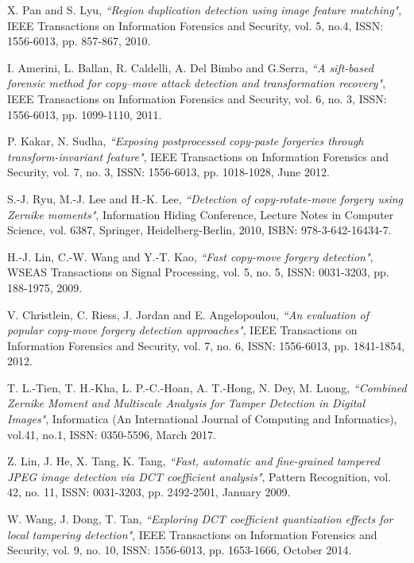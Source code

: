 X. Pan and S. Lyu,
\textit{``Region duplication detection using image feature matching"},
IEEE Transactions on Information Forensics and Security,
vol. 5, no.4, ISSN: 1556-6013, pp. 857-867, 2010.
	
I. Amerini, L. Ballan, R. Caldelli, A. Del Bimbo and G.Serra,
\textit{``A sift-based forensic method for copy–move attack detection and transformation recovery"},
IEEE Transactions on Information Forensics and Security,
vol. 6, no. 3, ISSN: 1556-6013, pp. 1099-1110, 2011.

P. Kakar, N. Sudha,
\textit{``Exposing postprocessed copy-paste forgeries through transform-invariant feature"},
IEEE Transactions on Information Forensics and Security,
vol. 7, no. 3, ISSN: 1556-6013, pp. 1018-1028, June 2012.

S.-J. Ryu, M.-J. Lee and H.-K. Lee,
\textit{``Detection of copy-rotate-move forgery using Zernike moments"},
Information Hiding Conference, Lecture Notes in Computer Science, vol. 6387, Springer,
Heidelberg-Berlin, 2010, ISBN: 978-3-642-16434-7.

H.-J. Lin, C.-W. Wang and Y.-T. Kao,
\textit{``Fast copy-move forgery detection"},
WSEAS Transactions on Signal Processing,
vol. 5, no. 5, ISSN: 0031-3203, pp. 188-1975, 2009.

V. Christlein, C. Riess, J. Jordan and E. Angelopoulou,
\textit{``An evaluation of popular copy-move forgery detection approaches"},
IEEE Transactions on Information Forensics and Security,
vol. 7, no. 6, ISSN: 1556-6013, pp. 1841-1854, 2012.

T. L.-Tien, T. H.-Kha, L. P.-C.-Hoan, A. T.-Hong, N. Dey, M. Luong,
\textit{``Combined Zernike Moment and Multiscale Analysis for Tamper Detection in Digital Images"},
Informatica (An International Journal of Computing and Informatics),
vol.41, no.1, ISSN: 0350-5596, March 2017.


Z. Lin, J. He, X. Tang, K. Tang,
\textit{``Fast, automatic and fine-grained tampered JPEG image detection via DCT coefficient analysis"},
Pattern Recognition, vol. 42, no. 11, ISSN: 0031-3203, pp. 2492-2501, January 2009.

W. Wang, J. Dong, T. Tan,
\textit{``Exploring DCT coefficient quantization effects for local tampering detection"},
IEEE Transactions on Information Forensics and Security,
vol. 9, no. 10, ISSN: 1556-6013, pp. 1653-1666, October 2014.


